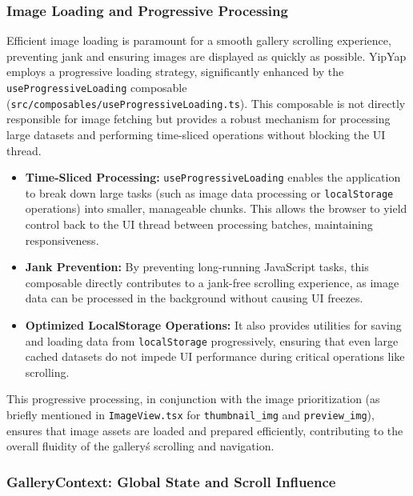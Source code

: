 \documentclass[10pt]{article}
\begin{document}
\subsubsection{Image Loading and Progressive Processing}

Efficient image loading is paramount for a smooth gallery scrolling experience, preventing jank and ensuring images are displayed as quickly as possible. YipYap employs a progressive loading strategy, significantly enhanced by the \texttt{useProgressiveLoading} composable (\texttt{src/composables/useProgressiveLoading.ts}). This composable is not directly responsible for image fetching but provides a robust mechanism for processing large datasets and performing time-sliced operations without blocking the UI thread.
\begin{itemize}
    \item \textbf{Time-Sliced Processing:} \texttt{useProgressiveLoading} enables the application to break down large tasks (such as image data processing or \texttt{localStorage} operations) into smaller, manageable chunks. This allows the browser to yield control back to the UI thread between processing batches, maintaining responsiveness.
    \item \textbf{Jank Prevention:} By preventing long-running JavaScript tasks, this composable directly contributes to a jank-free scrolling experience, as image data can be processed in the background without causing UI freezes.
    \item \textbf{Optimized LocalStorage Operations:} It also provides utilities for saving and loading data from \texttt{localStorage} progressively, ensuring that even large cached datasets do not impede UI performance during critical operations like scrolling.
\end{itemize}
This progressive processing, in conjunction with the image prioritization (as briefly mentioned in \texttt{ImageView.tsx} for \texttt{thumbnail\_img} and \texttt{preview\_img}), ensures that image assets are loaded and prepared efficiently, contributing to the overall fluidity of the gallery\'s scrolling and navigation.

\subsubsection{GalleryContext: Global State and Scroll Influence}
\end{document}
